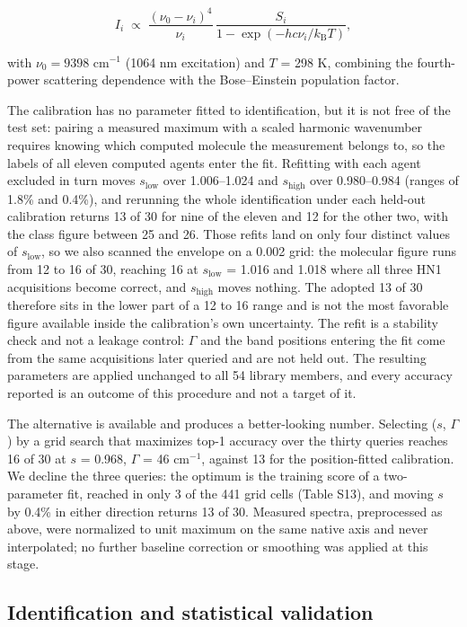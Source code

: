 \documentclass[review,12pt]{elsarticle}
\newcommand*\wn{\ensuremath{\text{cm}^{-1}}}
\begin{document}
\[
I_i \;\propto\; \frac{(\nu_0-\nu_i)^4}{\nu_i}\,\frac{S_i}{1-\exp(-hc\nu_i/k_\mathrm{B}T)},
\]

with $\nu_0 = 9398$ \wn{} (1064 nm excitation) and $T$ = 298 K, combining the fourth-power scattering dependence with the Bose--Einstein population factor.

The calibration has no parameter fitted to identification, but it is not free of the test set: pairing a measured maximum with a scaled harmonic wavenumber requires knowing which computed molecule the measurement belongs to, so the labels of all eleven computed agents enter the fit. Refitting with each agent excluded in turn moves $s_\mathrm{low}$ over 1.006--1.024 and $s_\mathrm{high}$ over 0.980--0.984 (ranges of 1.8\% and 0.4\%), and rerunning the whole identification under each held-out calibration returns 13 of 30 for nine of the eleven and 12 for the other two, with the class figure between 25 and 26. Those refits land on only four distinct values of $s_\mathrm{low}$, so we also scanned the envelope on a 0.002 grid: the molecular figure runs from 12 to 16 of 30, reaching 16 at $s_\mathrm{low}$ = 1.016 and 1.018 where all three HN1 acquisitions become correct, and $s_\mathrm{high}$ moves nothing. The adopted 13 of 30 therefore sits in the lower part of a 12 to 16 range and is not the most favorable figure available inside the calibration's own uncertainty. The refit is a stability check and not a leakage control: $\Gamma$ and the band positions entering the fit come from the same acquisitions later queried and are not held out. The resulting parameters are applied unchanged to all 54 library members, and every accuracy reported is an outcome of this procedure and not a target of it.

The alternative is available and produces a better-looking number. Selecting ($s$, $\Gamma$) by a grid search that maximizes top-1 accuracy over the thirty queries reaches 16 of 30 at $s$ = 0.968, $\Gamma$ = 46 \wn{}, against 13 for the position-fitted calibration. We decline the three queries: the optimum is the training score of a two-parameter fit, reached in only 3 of the 441 grid cells (Table S13), and moving $s$ by 0.4\% in either direction returns 13 of 30. Measured spectra, preprocessed as above, were normalized to unit maximum on the same native axis and never interpolated; no further baseline correction or smoothing was applied at this stage.

\subsection{Identification and statistical validation}
\end{document}
